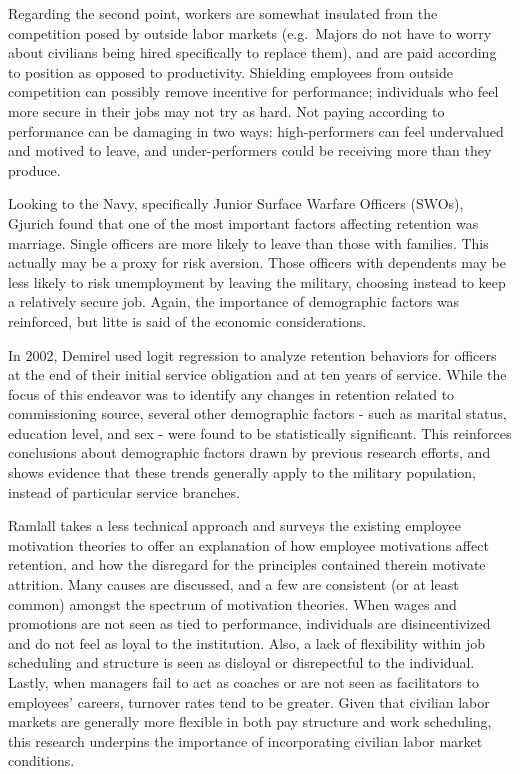 \documentclass[12pt,letterpaper,toc=flat,oneside]{report}
\theoremstyle{definition}
\theoremstyle{definition}
\theoremstyle{definition}
\theoremstyle{remark}
\begin{document}
Regarding the second point, workers are somewhat insulated from the
competition posed by outside labor markets (e.g.~Majors do not have to
worry about civilians being hired specifically to replace them), and are
paid according to position as opposed to productivity. Shielding
employees from outside competition can possibly remove incentive for
performance; individuals who feel more secure in their jobs may not try
as hard. Not paying according to performance can be damaging in two
ways: high-performers can feel undervalued and motived to leave, and
under-performers could be receiving more than they produce.

Looking to the Navy, specifically Junior Surface Warfare Officers
(SWOs), Gjurich \cite{gjurich-1999} found that one of the most important
factors affecting retention was marriage. Single officers are more
likely to leave than those with families. This actually may be a proxy
for risk aversion. Those officers with dependents may be less likely to
risk unemployment by leaving the military, choosing instead to keep a
relatively secure job. Again, the importance of demographic factors was
reinforced, but litte is said of the economic considerations.

In 2002, Demirel \cite{demirel-2002} used logit regression to analyze
retention behaviors for officers at the end of their initial service
obligation and at ten years of service. While the focus of this endeavor
was to identify any changes in retention related to commissioning
source, several other demographic factors - such as marital status,
education level, and sex - were found to be statistically significant.
This reinforces conclusions about demographic factors drawn by previous
research efforts, and shows evidence that these trends generally apply
to the military population, instead of particular service branches.

Ramlall \cite{ramlall-2004} takes a less technical approach and surveys
the existing employee motivation theories to offer an explanation of how
employee motivations affect retention, and how the disregard for the
principles contained therein motivate attrition. Many causes are
discussed, and a few are consistent (or at least common) amongst the
spectrum of motivation theories. When wages and promotions are not seen
as tied to performance, individuals are disincentivized and do not feel
as loyal to the institution. Also, a lack of flexibility within job
scheduling and structure is seen as disloyal or disrepectful to the
individual. Lastly, when managers fail to act as coaches or are not seen
as facilitators to employees' careers, turnover rates tend to be
greater. Given that civilian labor markets are generally more flexible
in both pay structure and work scheduling, this research underpins the
importance of incorporating civilian labor market conditions.
\end{document}
